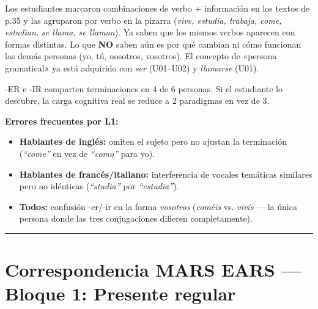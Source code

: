 \documentclass[a4paper,10pt]{article}
\begin{document}
\begin{estrategiabox}
Los estudiantes marcaron combinaciones de verbo + información en los textos de p.35 y las agruparon por verbo en la pizarra (\textit{vive, estudia, trabaja, come, estudian, se llama, se llaman}). Ya saben que los mismos verbos aparecen con formas distintas. Lo que \textbf{NO} saben aún es por qué cambian ni cómo funcionan las demás personas (yo, tú, nosotros, vosotros). El concepto de «persona gramatical» ya está adquirido con \textit{ser} (U01--U02) y \textit{llamarse} (U01).
\end{estrategiabox}

\vspace{0.3cm}

\begin{notabox}
-ER e -IR comparten terminaciones en 4 de 6 personas. Si el estudiante lo descubre, la carga cognitiva real se reduce a 2 paradigmas en vez de 3.
\end{notabox}

\vspace{0.3cm}

\textbf{Errores frecuentes por L1:}
\begin{itemize}[leftmargin=1.5em, itemsep=2pt]
\item \textbf{Hablantes de inglés:} omiten el sujeto pero no ajustan la terminación (\textit{``come''} en vez de \textit{``como''} para yo).
\item \textbf{Hablantes de francés/italiano:} interferencia de vocales temáticas similares pero no idénticas (\textit{``studia''} por \textit{``estudia''}).
\item \textbf{Todos:} confusión -er/-ir en la forma \textit{vosotros} (\textit{coméis} vs. \textit{vivís} — la única persona donde las tres conjugaciones difieren completamente).
\end{itemize}

\newpage


\noindent\textcolor{azulprincipal}{\rule{\linewidth}{2pt}}
\section*{\textcolor{azulprincipal}{Correspondencia MARS EARS — Bloque 1: Presente regular}}
\end{document}
